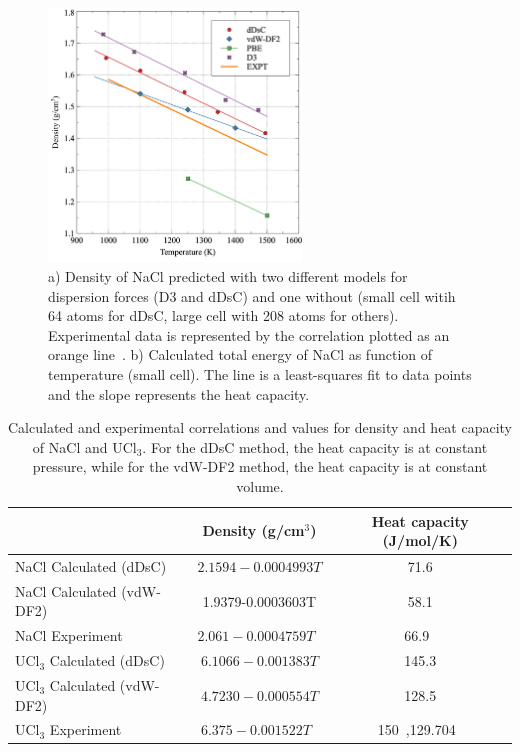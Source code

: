 \documentclass[preprint,3p,10pt,onecolumn,number,sort&compress]{elsarticle}
\begin{document}
\begin{figure}[htb]
\centering
\includegraphics[width=0.6\textwidth]{fig3a.jpg}
\caption{a) Density of NaCl predicted with two different models for dispersion forces (D3 and dDsC) and one without (small cell witih 64 atoms for dDsC, large cell with 208 atoms for others). Experimental data is represented by the correlation plotted as an orange line~\cite{Janz1988}. b) Calculated total energy of NaCl as function of temperature (small cell). The line is a least-squares fit to data points and the slope represents the heat capacity.} 
\label{fig:NaCldensity}
\end{figure}

\begin{table}[hb!]
\centering
\begin{tabular}{lcc}
\hline
\hline
& Density (g/cm$^3$) &Heat capacity (J/mol/K) \\
\hline
NaCl Calculated (dDsC)	&$2.1594-0.0004993T$ &71.6 \\
NaCl Calculated (vdW-DF2)	& 1.9379-0.0003603T & 58.1 \\
NaCl Experiment	&$2.061-0.0004759T$~\cite{Janz1988} &66.9~\cite{NIST}  \\	
UCl$_3$ Calculated (dDsC) &$6.1066-0.001383T$ &145.3 \\	
UCl$_3$ Calculated (vdW-DF2) &$4.7230-0.000554T$ & 128.5 \\	
UCl$_3$ Experiment	&$6.375-0.001522T$~\cite{Desyatnik} &150~\cite{BENES2008},129.704~\cite{YIN2020} \\
\hline
\hline
\end{tabular}
\caption{Calculated and experimental correlations and values for density and heat capacity of NaCl and UCl$_3$. For the dDsC method, the heat capacity is at constant pressure, while for the vdW-DF2 method, the heat capacity is at constant volume.}%
\label{table:NaCldensityetc}
\end{table}
\end{document}
